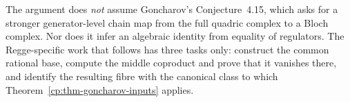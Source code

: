 The argument does \emph{not} assume Goncharov's Conjecture~4.15, which asks
for a stronger generator-level chain map from the full quadric complex to a
Bloch complex.  Nor does it infer an algebraic identity from equality of
regulators.  The Regge-specific work that follows has three tasks only:
construct the common rational base, compute the middle coproduct and prove
that it vanishes there, and identify the resulting fibre with the canonical
class to which Theorem~\ref{cp:thm-goncharov-inputs} applies.
